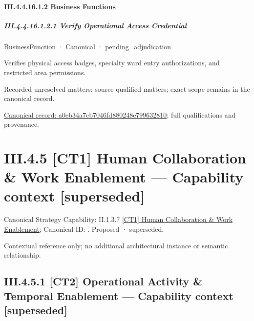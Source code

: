 \paragraph*{III.4.4.16.1.2 Business Functions}
\label{navigation:III.4.4.16.1.2}

\subparagraph*{III.4.4.16.1.2.1 Verify Operational Access Credential}
\label{navigation:III.4.4.16.1.2.1}

\label{element:a0eb34a7cb7046fd880248e799632810}
{\small BusinessFunction · Canonical · pending\_adjudication}\par

Verifies physical access badges, specialty ward entry authorizations, and restricted area permissions.


{\small Recorded unresolved matters: source-qualified matters; exact scope remains in the canonical record.}\par
{\footnotesize \href{../../../../../../../continuum/business/business-function/a0eb34a7cb7046fd880248e799632810.md}{Canonical record: a0eb34a7cb7046fd880248e799632810}; full qualifications and provenance.}\par
\section*{III.4.5 [CT1] Human Collaboration \& Work Enablement — Capability context [superseded]}
\label{navigation:III.4.5}

{\small Canonical Strategy Capability: II.1.3.7 \hyperref[element:c9347f73b21242c5b8cce41252b74da0]{[CT1] Human Collaboration \& Work Enablement}; Canonical ID: \texttt{}. Proposed · superseded.}\par
Contextual reference only; no additional architectural instance or semantic relationship.\par
\subsection*{III.4.5.1 [CT2] Operational Activity \& Temporal Enablement — Capability context [superseded]}
\label{navigation:III.4.5.1}

